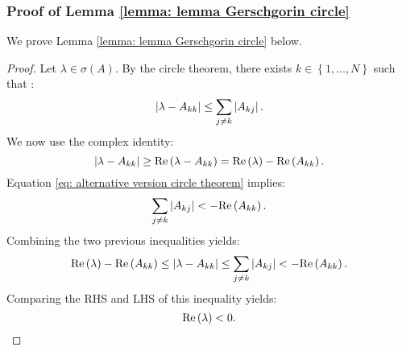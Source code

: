 \documentclass[12pt, titlepage, twoside, openright]{report}
\begin{document}
\subsubsection{Proof of Lemma \ref{lemma: lemma Gerschgorin circle}}
We prove Lemma \ref{lemma: lemma Gerschgorin circle} below.
\begin{proof}
Let $\lambda \in \sigma(A)$. By the circle theorem, there exists $k \in \left\{1,\dots, N\right\}$ such that :
\begin{equation}
\left|{\lambda-A_{kk}}\right| \leq \sum_{j\neq k} \left|{A_{kj}}\right|.
\end{equation}
We now use the complex identity:
\begin{equation}
\left|{\lambda-A_{kk}}\right| \geq \text{Re}\left(\lambda-A_{kk}\right) = \text{Re}\left(\lambda\right)-\text{Re}\left(A_{kk}\right).
\end{equation}
Equation \eqref{eq: alternative version circle theorem} implies:
\begin{equation}
\sum_{j\neq k}\left|{A_{kj}}\right| < - \text{Re}\left(A_{kk}\right).
\end{equation}
Combining the two previous inequalities yields:
\begin{equation}
\text{Re}\left(\lambda\right)-\text{Re}\left(A_{kk}\right) \leq \left|{\lambda-A_{kk}}\right| \leq \sum_{j\neq k} \left|{A_{kj}}\right| < -\text{Re}\left(A_{kk}\right).
\end{equation}
Comparing the RHS and LHS of this inequality yields:
\begin{equation}
\text{Re}\left(\lambda\right) < 0.
\end{equation}
\end{proof}
\end{document}
